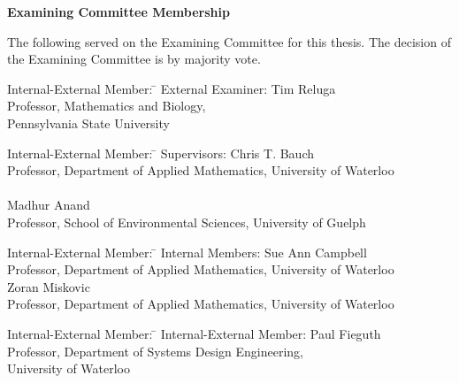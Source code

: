 \cleardoublepage %

 
\begin{center}\textbf{Examining Committee Membership}\end{center}
  \noindent
The following served on the Examining Committee for this thesis. The decision of the Examining Committee is by majority vote.
  \bigskip
  
  \noindent
\begin{tabbing}
Internal-External Member:  \=  \kill %
External Examiner: \> Tim Reluga  \\ 
\> Professor, Mathematics and Biology,\\
\> Pennsylvania State University\\
\end{tabbing} 
  \bigskip
  
  \noindent
\begin{tabbing}
Internal-External Member: \=  \kill %
Supervisors: \> Chris T. Bauch \\
\> Professor, Department of Applied Mathematics, University of Waterloo \\
\>\\
\> Madhur Anand \\
\> Professor, School of Environmental Sciences, University of Guelph \\
\end{tabbing}
  \bigskip
  
  \noindent
  \begin{tabbing}
Internal-External Member: \=  \kill %
Internal Members: \> Sue Ann Campbell \\
\> Professor, Department of Applied Mathematics, University of Waterloo \\ 
\> Zoran Miskovic  \\
\> Professor, Department of Applied Mathematics, University of Waterloo \\
\end{tabbing}
  \bigskip
  
  \noindent
\begin{tabbing}
Internal-External Member: \=  \kill %
Internal-External Member: \> Paul Fieguth \\
\> Professor, Department of Systems Design Engineering,\\
\> University of Waterloo \\
\end{tabbing}
  

